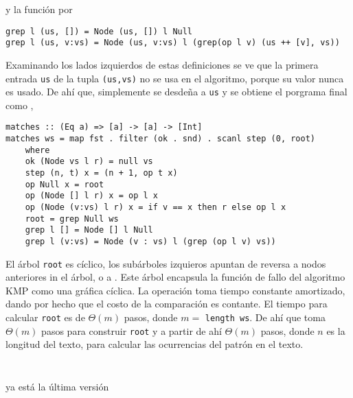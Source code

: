 y la función  por
\begin{verbatim}
grep l (us, []) = Node (us, []) l Null
grep l (us, v:vs) = Node (us, v:vs) l (grep(op l v) (us ++ [v], vs))
\end{verbatim}

Examinando los lados izquierdos de estas definiciones se ve que la primera entrada \texttt{us} de la tupla \texttt{(us,vs)} no se usa en el algoritmo,
porque su valor nunca es usado. De ahí que, simplemente se desdeña a \texttt{us} y se obtiene el porgrama final como , 

\begin{verbatim}
matches :: (Eq a) => [a] -> [a] -> [Int]
matches ws = map fst . filter (ok . snd) . scanl step (0, root)
    where
    ok (Node vs l r) = null vs
    step (n, t) x = (n + 1, op t x)
    op Null x = root
    op (Node [] l r) x = op l x
    op (Node (v:vs) l r) x = if v == x then r else op l x
    root = grep Null ws
    grep l [] = Node [] l Null
    grep l (v:vs) = Node (v : vs) l (grep (op l v) vs))
\end{verbatim}

El árbol \texttt{root} es cíclico, %
los subárboles izquieros apuntan de reversa a nodos anteriores in el árbol, o a .
Este árbol encapsula la función de fallo %
del algoritmo KMP como una gráfica cíclica. La operación  toma tiempo constante amortizado, dando por hecho que el costo de la comparación es contante.
El tiempo para calcular \texttt{root} es de $\Theta(m)$ pasos, donde $m =$ \texttt{length ws}. De ahí que  toma $\Theta(m)$ pasos para construir \texttt{root}
y a partir de ahí $\Theta(m)$ pasos, donde $n$ es la longitud del texto, para calcular las ocurrencias del patrón en el texto.
\inputminted{haskell}{codigo/haskell/MP1.hs}
\inputminted{haskell}{codigo/haskell/MP2.hs}



ya está la última versión
\inputminted{haskell}{codigo/haskell/KMP.hs}

